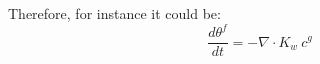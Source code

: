 Therefore, for instance it could be:
\begin{equation}
\frac{d \theta^f}{dt} = - {\nabla}\cdot  K_w\ c^g
\end{equation}